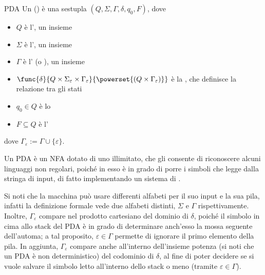 \documentclass[a4paper, 12pt]{report}
\begin{document}
    \begin{frameddefn}{PDA}
        Un  () è una sestupla $(Q, \Sigma, \Gamma, \delta, q_0, F)$, dove

        \begin{itemize}
            \item $Q$ è l', un insieme 
            \item $\Sigma$ è l', un insieme 
            \item $\Gamma$ è l' (o ), un insieme 
            \item $\func{\delta}{Q \times \Sigma_\varepsilon \times \Gamma_\varepsilon}{\powerset{(Q \times \Gamma_\varepsilon)}}$ è la , che definisce la relazione tra gli stati
            \item $q_0 \in Q$ è lo 
            \item $F \subseteq Q$ è l'
        \end{itemize}

        dove $\Gamma_\varepsilon := \Gamma \cup \{ \varepsilon \}$.

        Un PDA è un NFA dotato di uno  illimitato, che gli consente di riconoscere alcuni linguaggi non regolari, poiché in esso è in grado di porre i simboli che legge dalla stringa di input, di fatto implementando un sistema di .
        
        Si noti che la macchina può usare differenti alfabeti per il suo input e la sua pila, infatti la definizione formale vede due alfabeti distinti, $\Sigma$ e $\Gamma$ rispettivamente. Inoltre, $\Gamma_\varepsilon$ compare nel prodotto cartesiano del dominio di $\delta$, poiché il simbolo in cima allo stack del PDA è in grado di determinare anch'esso la mossa seguente dell'automa; a tal proposito, $\varepsilon \in \Gamma$ permette di ignorare il primo elemento della pila. In aggiunta, $\Gamma_\varepsilon$ compare anche all'interno dell'insieme potenza (si noti che un PDA è non deterministico) del codominio di $\delta$, al fine di poter decidere se si vuole salvare il simbolo letto all'interno dello stack o meno (tramite $\varepsilon \in \Gamma$).
    \end{frameddefn}
\end{document}
